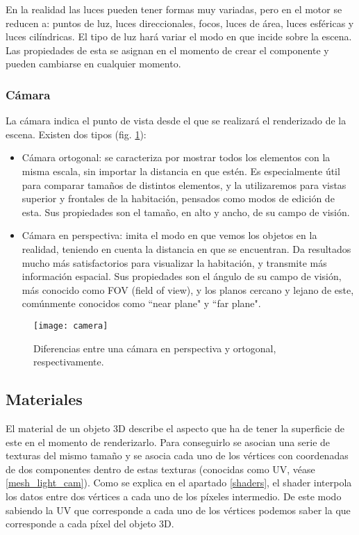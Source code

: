 En la realidad las luces pueden tener formas muy variadas, pero en el motor se reducen a: puntos de luz, luces direccionales, focos, luces de área, luces esféricas y luces cilíndricas. El tipo de luz hará variar el modo en que incide sobre la escena. Las propiedades de esta se asignan en el momento de crear el componente y pueden cambiarse en cualquier momento.

\subsubsection{Cámara}
La cámara indica el punto de vista desde el que se realizará el renderizado de la escena. Existen dos tipos (fig. \ref{fig:camera}):

\begin{itemize}
    \item Cámara ortogonal: se caracteriza por mostrar todos los elementos con la misma escala, sin importar la distancia en que estén. Es especialmente útil para comparar tamaños de distintos elementos, y la utilizaremos para vistas superior y frontales de la habitación, pensados como modos de edición de esta. Sus propiedades son el tamaño, en alto y ancho, de su campo de visión.
    \item Cámara en perspectiva: imita el modo en que vemos los objetos en la realidad, teniendo en cuenta la distancia en que se encuentran. Da resultados mucho más satisfactorios para visualizar la habitación, y transmite más información espacial. Sus propiedades son el ángulo de su campo de visión, más conocido como FOV (field of view), y los planos cercano y lejano de este, comúnmente conocidos como ``near plane" y ``far plane".
\end{itemize}

\begin{figure}[H]
    \centering
    \texttt{[image: camera]}
    \caption{Diferencias entre una cámara en perspectiva y ortogonal, respectivamente.}
    \label{fig:camera}
\end{figure}

\subsection{Materiales}
\label{materials}
El material de un objeto 3D describe el aspecto que ha de tener la superficie de este en el momento de renderizarlo. Para conseguirlo se asocian una serie de texturas del mismo tamaño y se asocia cada uno de los vértices con coordenadas de dos componentes dentro de estas texturas (conocidas como UV, véase \ref{mesh_light_cam}). Como se explica en el apartado \ref{shaders}, el shader interpola los datos entre dos vértices a cada uno de los píxeles intermedio. De este modo sabiendo la UV que corresponde a cada uno de los vértices podemos saber la que corresponde a cada píxel del objeto 3D.

